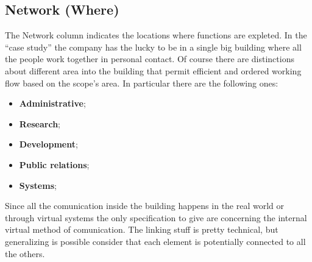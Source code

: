 \subsection{Network (Where)}
\label{subsec:enterprise[Network]}
The Network column indicates the locations where functions are expleted. In the ``case study'' the company has the lucky to be in a single big building where all the people work together in personal contact. Of course there are distinctions about different area into the building that permit efficient and ordered working flow based on the scope's area. In particular there are the following ones:
\begin{itemize}
  \item {\bf Administrative};
  \item {\bf Research};
  \item {\bf Development};
  \item {\bf Public relations};
  \item {\bf Systems};
\end{itemize}


Since all the comunication inside the building happens in the real world or through virtual systems the only specification to give are concerning the internal virtual method of comunication. The linking stuff is pretty technical, but generalizing is possible consider that each element is potentially connected to all the others.


